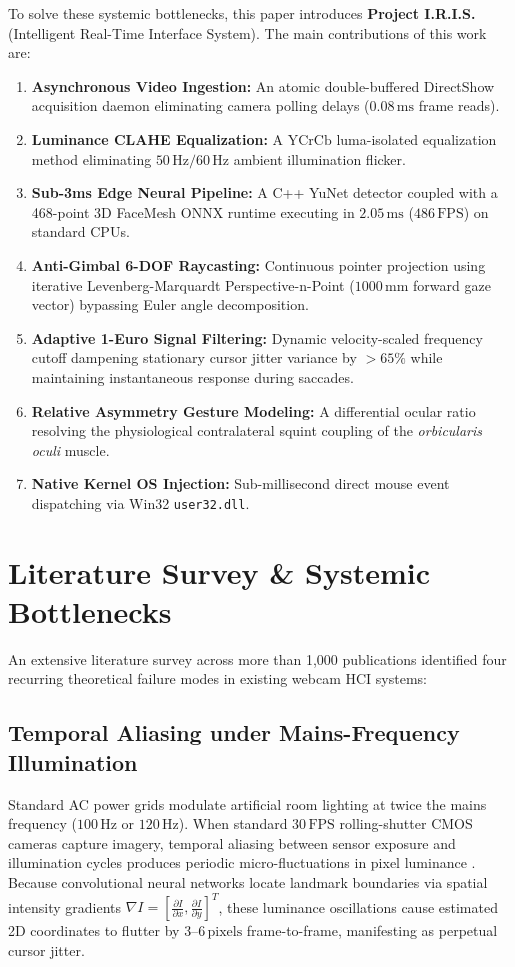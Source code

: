 \documentclass[conference]{IEEEtran}
\begin{document}
To solve these systemic bottlenecks, this paper introduces \textbf{Project I.R.I.S.} (Intelligent Real-Time Interface System). The main contributions of this work are:
\begin{enumerate}
    \item \textbf{Asynchronous Video Ingestion:} An atomic double-buffered DirectShow acquisition daemon eliminating camera polling delays ($0.08\,\text{ms}$ frame reads).
    \item \textbf{Luminance CLAHE Equalization:} A $\text{YCrCb}$ luma-isolated equalization method eliminating $50\,\text{Hz}/60\,\text{Hz}$ ambient illumination flicker.
    \item \textbf{Sub-3ms Edge Neural Pipeline:} A C++ YuNet detector coupled with a 468-point 3D FaceMesh ONNX runtime executing in $2.05\,\text{ms}$ ($486\,\text{FPS}$) on standard CPUs.
    \item \textbf{Anti-Gimbal 6-DOF Raycasting:} Continuous pointer projection using iterative Levenberg-Marquardt Perspective-n-Point ($1000\,\text{mm}$ forward gaze vector) bypassing Euler angle decomposition.
    \item \textbf{Adaptive 1-Euro Signal Filtering:} Dynamic velocity-scaled frequency cutoff dampening stationary cursor jitter variance by $>65\%$ while maintaining instantaneous response during saccades.
    \item \textbf{Relative Asymmetry Gesture Modeling:} A differential ocular ratio resolving the physiological contralateral squint coupling of the \textit{orbicularis oculi} muscle.
    \item \textbf{Native Kernel OS Injection:} Sub-millisecond direct mouse event dispatching via Win32 \texttt{user32.dll}.
\end{enumerate}

\section{Literature Survey \& Systemic Bottlenecks}
An extensive literature survey across more than 1,000 publications identified four recurring theoretical failure modes in existing webcam HCI systems:

\subsection{Temporal Aliasing under Mains-Frequency Illumination}
Standard AC power grids modulate artificial room lighting at twice the mains frequency ($100\,\text{Hz}$ or $120\,\text{Hz}$). When standard $30\,\text{FPS}$ rolling-shutter CMOS cameras capture imagery, temporal aliasing between sensor exposure and illumination cycles produces periodic micro-fluctuations in pixel luminance \cite{zuiderveld1994}. Because convolutional neural networks locate landmark boundaries via spatial intensity gradients $\nabla I = [\frac{\partial I}{\partial x}, \frac{\partial I}{\partial y}]^T$, these luminance oscillations cause estimated 2D coordinates to flutter by $3$--$6\,\text{pixels}$ frame-to-frame, manifesting as perpetual cursor jitter.
\end{document}
